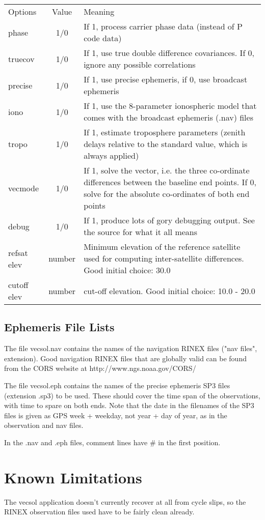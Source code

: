 \begin{tabular}{|l|c|l|} \hline

Options & Value & Meaning \\
phase   & 1/0   & If 1, process carrier phase data (instead of P code data) \\
truecov & 1/0   & If 1, use true double difference covariances. If 0, ignore any possible correlations \\
precise & 1/0   & If 1, use precise ephemeris, if 0, use broadcast ephemeris \\
iono    & 1/0   & If 1, use the 8-parameter ionospheric model that comes with the broadcast  ephemeris (.nav) files \\
tropo   & 1/0   & If 1, estimate troposphere parameters (zenith delays relative to the standard value, which is always applied) \\
vecmode & 1/0   & If 1, solve the vector, i.e. the three co-ordinate differences between the  baseline end points. If 0, solve for the absolute co-ordinates of both end points \\
debug   & 1/0   & If 1, produce lots of gory debugging output. See the source for what it all means \\
refsat elev & number & Minimum elevation of the reference satellite used for computing inter-satellite differences.  Good initial choice: 30.0 \\
cutoff elev & number & cut-off elevation. Good initial choice: 10.0 - 20.0 \\
\hline
\end{tabular}

\subsection{Ephemeris File Lists}
The file vecsol.nav contains the names of the navigation RINEX files ("nav files", extension). Good navigation RINEX files that are globally valid can be found  from  the  CORS  website  at http://www.ngs.noaa.gov/CORS/

The file vecsol.eph contains  the  names  of  the  precise ephemeris SP3 files (extension .sp3) to be used. These should cover the time span of the observations, with time to spare on both  ends. Note  that the date in the filenames of the SP3 files is given as GPS week + weekday, not year + day of year, as in the observation and nav files.

In the .nav and .eph files, comment lines have \# in the first position.

\section{Known Limitations}
The vecsol application doesn't currently recover at all from cycle slips, so the RINEX observation files used have to be fairly clean already.

